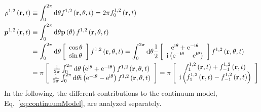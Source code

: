 \documentclass{article}
\begin{document}
\begin{subequations}
    \begin{align}
        \rho^{1,2} \left( \mathbf{r},t \right) &\equiv \int_0^{2\pi}{\mathrm{d}\theta f^{1,2}\left( \mathbf{r},\theta ,t \right)}=2\pi f_{0}^{1,2}\left( \mathbf{r},t \right)
        \label{eq:particleDensity}
        \\
        \boldsymbol{p}^{1,2}\left( \mathbf{r},t \right) &\equiv \int_0^{2\pi}{\mathrm{d}\theta \mathbf{p}\left( \theta \right) f^{1,2}\left( \mathbf{r},\theta ,t \right)}\notag\\
        &=\int_0^{2\pi}{\mathrm{d}\theta \left[ \begin{array}{c}
        \cos \theta\\
        \sin \theta\\
    \end{array} \right] f^{1,2}\left( \mathbf{r},\theta ,t \right)}=\int_0^{2\pi}{\mathrm{d}\theta \frac{1}{2}\left[ \begin{array}{c}
        \mathrm{e}^{\mathrm{i}\theta}+\mathrm{e}^{-\mathrm{i}\theta}\\
        \mathrm{i}\left( \mathrm{e}^{-\mathrm{i}\theta}-\mathrm{e}^{\mathrm{i}\theta} \right)\\
    \end{array} \right] f^{1,2}\left( \mathbf{r},\theta ,t \right)}\notag\\
        &=\pi \left[ \begin{array}{c}
        \frac{1}{2\pi}\int_0^{2\pi}{\mathrm{d}\theta \left( \mathrm{e}^{\mathrm{i}\theta}+\mathrm{e}^{-\mathrm{i}\theta} \right) f^{1,2}\left( \mathbf{r},\theta ,t \right)}\\
        \frac{1}{2\pi}\int_0^{2\pi}{\mathrm{d}\theta \mathrm{i}\left( \mathrm{e}^{-\mathrm{i}\theta}-\mathrm{e}^{\mathrm{i}\theta} \right) f^{1,2}\left( \mathbf{r},\theta ,t \right)}\\
    \end{array} \right] =\pi \left[ \begin{array}{c}
        f_{1}^{1,2}\left( \mathbf{r},t \right) +f_{-1}^{1,2}\left( \mathbf{r},t \right)\\
        \mathrm{i}\left( f_{1}^{1,2}\left( \mathbf{r},t \right) -f_{-1}^{1,2}\left( \mathbf{r},t \right) \right)\\
    \end{array} \right]
    \label{eq:polarOrder}
    \end{align}
\end{subequations}
In the following, the different contributions to the continuum model, Eq.~\eqref{eq:continuumModel}, are analyzed separately.
\end{document}
